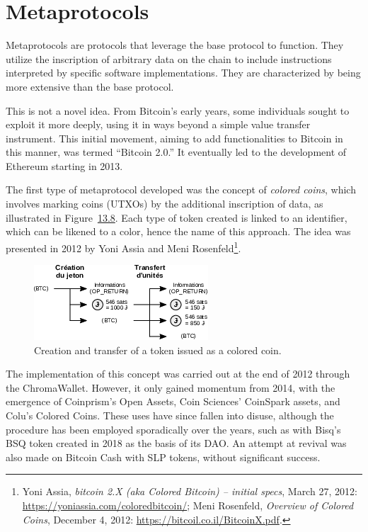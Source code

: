 \documentclass[
  a5paper,
  smalldemyvopaper,10pt,twoside,onecolumn,openright,extrafontsizes,hidelinks]{memoir}
\begin{document}
\section*{Metaprotocols}\label{metaprotocols}


Metaprotocols are protocols that leverage the base protocol to function.
They utilize the inscription of arbitrary data on the chain to include
instructions interpreted by specific software implementations. They are
characterized by being more extensive than the base protocol.

This is not a novel idea. From Bitcoin's early years, some individuals
sought to exploit it more deeply, using it in ways beyond a simple value
transfer instrument. This initial movement, aiming to add
functionalities to Bitcoin in this manner, was termed ``Bitcoin 2.0.''
It eventually led to the development of Ethereum starting in 2013.

The first type of metaprotocol developed was the concept of
\emph{colored coins}, which involves marking coins (UTXOs) by the
additional inscription of data, as illustrated in
Figure~\hyperref[fig:colored-coin]{13.8}. Each type of token created is
linked to an identifier, which can be likened to a color, hence the name
of this approach. The idea was presented in 2012 by Yoni Assia and Meni
Rosenfeld\footnote{Yoni Assia, \emph{bitcoin 2.X (aka Colored Bitcoin)
  -- initial specs}, March 27, 2012:
  \url{https://yoniassia.com/coloredbitcoin/}; Meni Rosenfeld,
  \emph{Overview of Colored Coins}, December 4, 2012:
  \url{https://bitcoil.co.il/BitcoinX.pdf}.}.

\begin{figure}

{\centering \includegraphics{chapters/img/colored-coin.png}

}

\caption{Creation and transfer of a token issued as a colored coin.}

\end{figure}%

The implementation of this concept was carried out at the end of 2012
through the ChromaWallet. However, it only gained momentum from 2014,
with the emergence of Coinprism's Open Assets, Coin Sciences' CoinSpark
assets, and Colu's Colored Coins. These uses have since fallen into
disuse, although the procedure has been employed sporadically over the
years, such as with Bisq's BSQ token created in 2018 as the basis of its
DAO. An attempt at revival was also made on Bitcoin Cash with SLP
tokens, without significant success.
\end{document}
